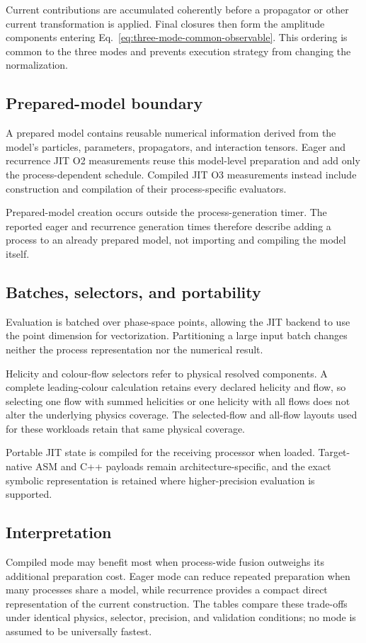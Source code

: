 Current contributions are accumulated coherently before a propagator or other
current transformation is applied. Final closures then form the amplitude
components entering Eq.~\eqref{eq:three-mode-common-observable}. This ordering
is common to the three modes and prevents execution strategy from changing the
normalization.

\subsection{Prepared-model boundary}

A prepared model contains reusable numerical information derived from the
model's particles, parameters, propagators, and interaction tensors. Eager and
recurrence JIT O2 measurements reuse this model-level preparation and add only
the process-dependent schedule. Compiled JIT O3 measurements instead include
construction and compilation of their process-specific evaluators.

Prepared-model creation occurs outside the process-generation timer. The
reported eager and recurrence generation times therefore describe adding a
process to an already prepared model, not importing and compiling the model
itself.

\subsection{Batches, selectors, and portability}

Evaluation is batched over phase-space points, allowing the JIT backend to use
the point dimension for vectorization. Partitioning a large input batch changes
neither the process representation nor the numerical result.

Helicity and colour-flow selectors refer to physical resolved components. A
complete leading-colour calculation retains every declared helicity and flow,
so selecting one flow with summed helicities or one helicity with all flows
does not alter the underlying physics coverage. The selected-flow and all-flow
layouts used for these workloads retain that same physical coverage.

Portable JIT state is compiled for the receiving processor when loaded.
Target-native ASM and C++ payloads remain architecture-specific, and the exact
symbolic representation is retained where higher-precision evaluation is
supported.

\subsection{Interpretation}

Compiled mode may benefit most when process-wide fusion outweighs its
additional preparation cost. Eager mode can reduce repeated preparation when
many processes share a model, while recurrence provides a compact direct
representation of the current construction. The tables compare these
trade-offs under identical physics, selector, precision, and validation
conditions; no mode is assumed to be universally fastest.

